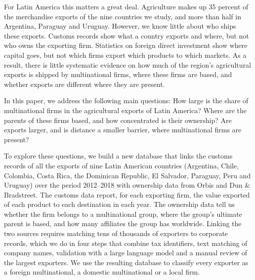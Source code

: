 \documentclass[11pt,a4paper]{article}
\begin{document}
For Latin America this matters a great deal. Agriculture makes up 35 percent of the merchandise
exports of the nine countries we study, and more than half in Argentina, Paraguay and Uruguay.
However, we know little about who ships these exports. Customs records show what a country exports
and where, but not who owns the exporting firm. Statistics on foreign direct investment show where
capital goes, but not which firms export which products to which markets. As a result, there is
little systematic evidence on how much of the region's agricultural exports is shipped by
multinational firms, where these firms are based, and whether exports are different where they
are present.

In this paper, we address the following main questions: How large is the share of multinational
firms in the agricultural exports of Latin America? Where are the parents of these firms based,
and how concentrated is their ownership? Are exports larger, and is distance a smaller barrier,
where multinational firms are present?

To explore these questions, we build a new database that links the customs records of all the
exports of nine Latin American countries (Argentina, Chile, Colombia, Costa Rica, the Dominican
Republic, El Salvador, Paraguay, Peru and Uruguay) over the period 2012--2018 with ownership data
from Orbis and Dun \& Bradstreet. The customs data report, for each exporting firm, the value
exported of each product to each destination in each year. The ownership data tell us whether the
firm belongs to a multinational group, where the group's ultimate parent is based, and how many
affiliates the group has worldwide. Linking the two sources requires matching tens of thousands of
exporters to corporate records, which we do in four steps that combine tax identifiers, text
matching of company names, validation with a large language model and a manual review of the
largest exporters. We use the resulting database to classify every exporter as a foreign
multinational, a domestic multinational or a local firm.
\end{document}
